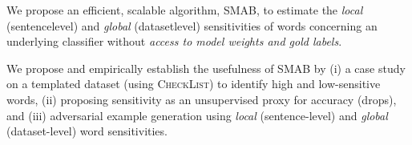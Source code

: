 \begin{compactitem}
    \item We propose an efficient, scalable algorithm, SMAB, to estimate the \textit{local} (sentence\-level) and \textit{global} (dataset\-level) sensitivities of words concerning an underlying classifier without \textit{access to model weights and gold labels}.
    \item We propose and empirically establish the usefulness of SMAB by (i) a case study on a templated dataset (using \textsc{CheckList}) to identify high and low-sensitive words, (ii) proposing sensitivity as an unsupervised proxy for accuracy (drops), and (iii) adversarial example generation using \textit{local} (sentence-level) and \textit{global} (dataset-level) word sensitivities. 
\end{compactitem}